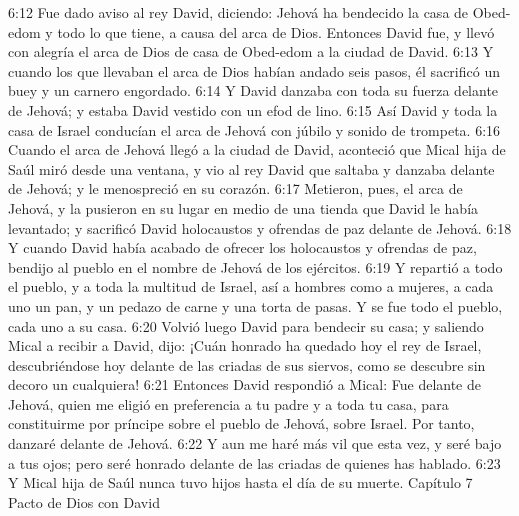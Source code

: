 6:12 Fue dado aviso al rey David, diciendo: Jehová ha bendecido la casa de Obed-edom y todo lo que tiene, a causa del arca de Dios. Entonces David fue, y llevó con alegría el arca de Dios de casa de Obed-edom a la ciudad de David.  
6:13 Y cuando los que llevaban el arca de Dios habían andado seis pasos, él sacrificó un buey y un carnero engordado.  
6:14 Y David danzaba con toda su fuerza delante de Jehová; y estaba David vestido con un efod de lino.  
6:15 Así David y toda la casa de Israel conducían el arca de Jehová con júbilo y sonido de trompeta.  
6:16 Cuando el arca de Jehová llegó a la ciudad de David, aconteció que Mical hija de Saúl miró desde una ventana, y vio al rey David que saltaba y danzaba delante de Jehová; y le menospreció en su corazón.  
6:17 Metieron, pues, el arca de Jehová, y la pusieron en su lugar en medio de una tienda que David le había levantado; y sacrificó David holocaustos y ofrendas de paz delante de Jehová.  
6:18 Y cuando David había acabado de ofrecer los holocaustos y ofrendas de paz, bendijo al pueblo en el nombre de Jehová de los ejércitos.  
6:19 Y repartió a todo el pueblo, y a toda la multitud de Israel, así a hombres como a mujeres, a cada uno un pan, y un pedazo de carne y una torta de pasas. Y se fue todo el pueblo, cada uno a su casa.  
6:20 Volvió luego David para bendecir su casa; y saliendo Mical a recibir a David, dijo: ¡Cuán honrado ha quedado hoy el rey de Israel, descubriéndose hoy delante de las criadas de sus siervos, como se descubre sin decoro un cualquiera!  
6:21 Entonces David respondió a Mical: Fue delante de Jehová, quien me eligió en preferencia a tu padre y a toda tu casa, para constituirme por príncipe sobre el pueblo de Jehová, sobre Israel. Por tanto, danzaré delante de Jehová.  
6:22 Y aun me haré más vil que esta vez, y seré bajo a tus ojos; pero seré honrado delante de las criadas de quienes has hablado. 
6:23 Y Mical hija de Saúl nunca tuvo hijos hasta el día de su muerte.  
Capítulo 7 
Pacto de Dios con David  
 

